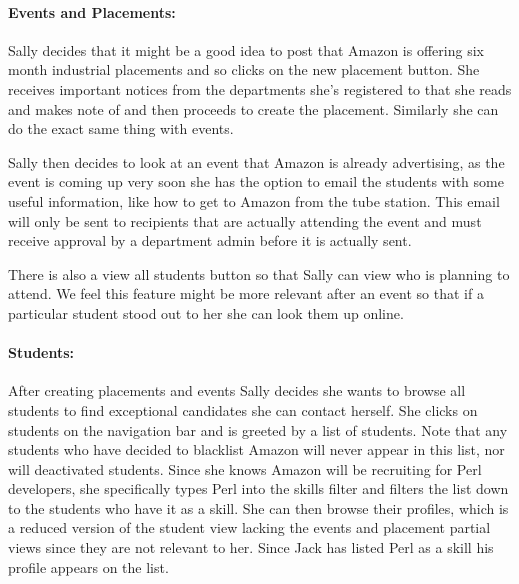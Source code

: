   \paragraph{Events and Placements:}
    Sally decides that it might be a good idea to post that Amazon is offering six month industrial placements and so clicks on the new placement button. 
    She receives important notices from the departments she's registered to that she reads and makes note of and then proceeds to create the placement.
    Similarly she can do the exact same thing with events.

    Sally then decides to look at an event that Amazon is already advertising, as the event is coming up very soon she has the option to email the students with some useful information, like how to get to Amazon from the tube station.
    This email will only be sent to recipients that are actually attending the event and must receive approval by a department admin before it is actually sent.

    There is also a view all students button so that Sally can view who is planning to attend. We feel this feature might be more relevant after an event so that if a particular student stood out to her she can look them up online.
  
  \paragraph{Students:}
    After creating placements and events Sally decides she wants to browse all students to find exceptional candidates she can contact herself. She clicks on students on the navigation bar and is greeted by a list of students. Note that any students who have decided to blacklist Amazon will never appear in this list, nor will deactivated students.
    Since she knows Amazon will be recruiting for Perl developers, she specifically types Perl into the skills filter
    and filters the list down to the students who have it as a skill.
    She can then browse their profiles, which is a reduced version of the student view lacking the events and placement partial views since they are not relevant to her. Since Jack has listed Perl as a skill his profile appears on the list.

